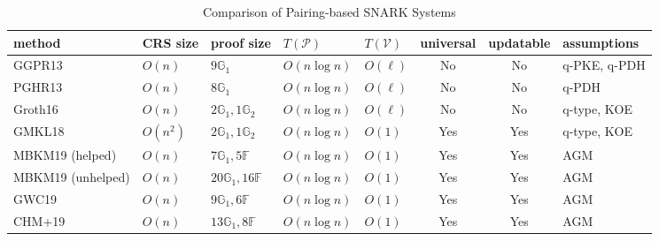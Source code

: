 \begin{table}[!t]
\caption{Comparison of Pairing-based SNARK Systems}
\begin{tabular}{|l|l|p{3.2cm}|l|l|c|c|l|}
\hline
\toprule
method & CRS size & proof size & $T(\mathcal{P})$ & $T(\mathcal{V})$ & universal & updatable & assumptions \\ \hline\toprule
\midrule
GGPR13 & $O(n)$ & $9 \mathbb{G}_1$ & $O(n \log n)$ & $O(\ell)$ & No & No & q-PKE, q-PDH \\ \hline
PGHR13 & $O(n)$ & $8 \mathbb{G}_1$ & $O(n \log n)$ & $O(\ell)$ & No & No & q-PDH \\ \hline
Groth16 & $O(n)$ & $2 \mathbb{G}_1, 1 \mathbb{G}_2$ & $O(n \log n)$ & $O(\ell)$ & No & No & q-type, KOE \\ \hline
GMKL18 & $O(n^2)$ & $2 \mathbb{G}_1, 1 \mathbb{G}_2$ & $O(n \log n)$ & $O(1)$ & Yes & Yes & q-type, KOE \\ \hline
MBKM19 (helped) & $O(n)$ & $7 \mathbb{G}_1, 5 \mathbb{F}$ & $O(n \log n)$ & $O(1)$ & Yes & Yes & AGM \\ \hline
MBKM19 (unhelped) & $O(n)$ & $20 \mathbb{G}_1, 16 \mathbb{F}$ & $O(n \log n)$ & $O(1)$ & Yes & Yes & AGM \\ \hline
GWC19 & $O(n)$ & $9 \mathbb{G}_1, 6 \mathbb{F}$ & $O(n \log n)$ & $O(1)$ & Yes & Yes & AGM \\ \hline
CHM+19 & $O(n)$ & $13 \mathbb{G}_1, 8 \mathbb{F}$ & $O(n \log n)$ & $O(1)$ & Yes & Yes & AGM \\ \hline\bottomrule
\bottomrule
\bottomrule
\end{tabular}
\end{table}
